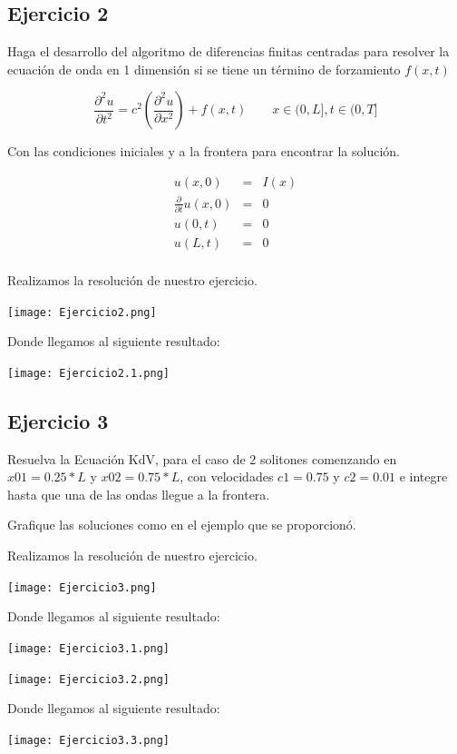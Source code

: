 \documentclass[12pt]{article}
\begin{document}


\subsection{Ejercicio 2}

Haga el desarrollo del algoritmo de diferencias finitas centradas para resolver la ecuación de onda en 1 dimensión si se tiene un término de forzamiento $f(x,t)$

\begin{equation*}
\frac{\partial^2 u}{\partial t^2} = c^2 \left( 
  \frac{\partial^2 u}{\partial x^2}
   \right) + f(x,t) \qquad x \in (0,L], t \in (0,T]
\end{equation*}

Con las condiciones iniciales y a la frontera para encontrar la solución.

\begin{eqnarray*}
u(x,0) & = & I(x) \\
\frac{\partial}{\partial t} u(x,0) & = & 0 \\
u(0,t) & = & 0 \\
u(L,t) & = & 0 \\
\end{eqnarray*}

Realizamos la resolución de nuestro ejercicio.

\begin{center}
    \texttt{[image: Ejercicio2.png]}
    
    Donde llegamos al siguiente resultado:
    
    \texttt{[image: Ejercicio2.1.png]}
\end{center}




\subsection{Ejercicio 3}

Resuelva la Ecuación KdV, para el caso de 2 solitones comenzando en $x01 = 0.25*L$ y $x02 = 0.75*L$, con velocidades $c1=0.75$ y $c2=0.01$ e integre hasta que una de las ondas llegue a la frontera.

Grafique las soluciones como en el ejemplo que se proporcionó.


Realizamos la resolución de nuestro ejercicio.

\begin{center}
    \texttt{[image: Ejercicio3.png]}
    
    Donde llegamos al siguiente resultado:
    
    \texttt{[image: Ejercicio3.1.png]}
    
     \texttt{[image: Ejercicio3.2.png]}
    
    Donde llegamos al siguiente resultado:
    
    \texttt{[image: Ejercicio3.3.png]}
\end{center}
\end{document}

